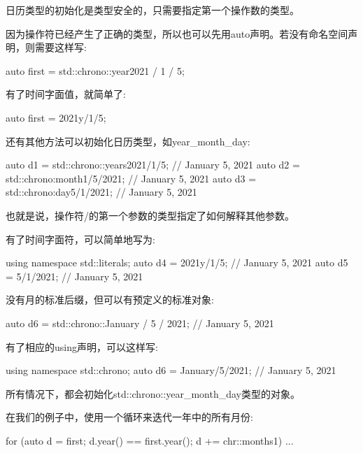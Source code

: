 日历类型的初始化是类型安全的，只需要指定第一个操作数的类型。

因为操作符已经产生了正确的类型，所以也可以先用auto声明。若没有命名空间声明，则需要这样写:

\begin{cpp}
auto first = std::chrono::year{2021} / 1 / 5;
\end{cpp}

有了时间字面值，就简单了:

\begin{cpp}
auto first = 2021y/1/5;
\end{cpp}


还有其他方法可以初始化日历类型，如year\_month\_day:

\begin{cpp}
auto d1 = std::chrono::years{2021}/1/5; // January 5, 2021
auto d2 = std::chrono:month{1}/5/2021; // January 5, 2021
auto d3 = std::chrono:day{5}/1/2021; // January 5, 2021
\end{cpp}

也就是说，操作符/的第一个参数的类型指定了如何解释其他参数。

有了时间字面符，可以简单地写为:

\begin{cpp}
using namespace std::literals;
auto d4 = 2021y/1/5; // January 5, 2021
auto d5 = 5/1/2021; // January 5, 2021
\end{cpp}

没有月的标准后缀，但可以有预定义的标准对象:

\begin{cpp}
auto d6 = std::chrono::January / 5 / 2021; // January 5, 2021
\end{cpp}

有了相应的using声明，可以这样写:

\begin{cpp}
using namespace std::chrono;
auto d6 = January/5/2021; // January 5, 2021
\end{cpp}

所有情况下，都会初始化std::chrono::year\_month\_day类型的对象。


在我们的例子中，使用一个循环来迭代一年中的所有月份:

\begin{cpp}
for (auto d = first; d.year() == first.year(); d += chr::months{1}) {
	...
}
\end{cpp}

